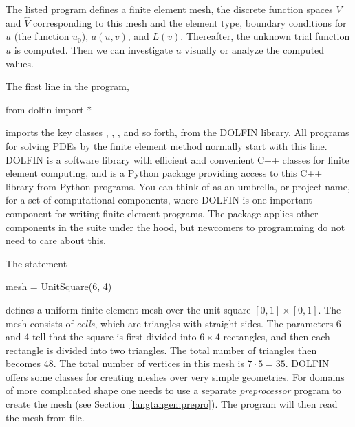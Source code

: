 The listed \fenics{} program defines a finite element mesh, the discrete
function spaces $V$ and $\hat{V}$ corresponding to this mesh and the
element type, boundary conditions for $u$ (the function $u_0$), $a(u,v)$,
and $L(v)$.  Thereafter, the unknown trial function $u$ is computed. Then
we can investigate $u$ visually or analyze the computed values.

The first line in the program,
\begin{python}
from dolfin import *
\end{python}
imports the key classes , ,
, and so forth, from the DOLFIN library.  All \fenics{}
programs for solving PDEs by the finite element method normally start with
this line. DOLFIN is a software library with efficient and convenient
C++ classes for finite element computing, and  is a Python
package providing access to this C++ library from Python programs.
You can think of \fenics{} as an umbrella, or project name, for a set
of computational components, where DOLFIN is one important component for
writing finite element programs. The  package
applies other components in the
\fenics{} suite under the hood, but newcomers to \fenics{} programming
do not need to care about this.

The statement
\begin{python}
mesh = UnitSquare(6, 4)
\end{python}
defines a uniform finite element mesh over the unit square $[0,1]\times
[0,1]$. The mesh consists of \emph{cells}, which are triangles with
straight sides. The parameters 6 and 4 tell that the square is first
divided into $6\times 4$ rectangles, and then each rectangle is divided
into two triangles. The total number of triangles then becomes 48. The
total number of vertices in this mesh is $7\cdot 5=35$.  DOLFIN offers
some classes for creating meshes over very simple geometries. For domains
of more complicated shape one needs to use a separate \emph{preprocessor}
program to create the mesh (see Section~\ref{langtangen:prepro}).
The \fenics{} program will then read the
mesh from file.

